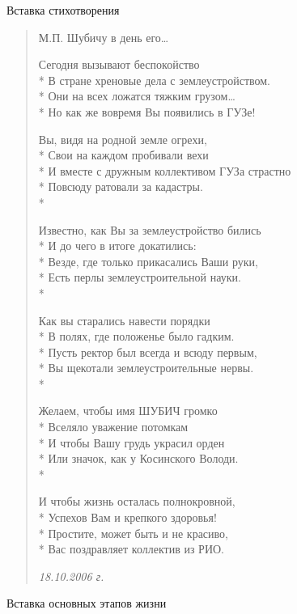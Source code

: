 Вставка стихотворения

\begin{verse}
М.П. Шубичу
в день его…

Сегодня вызывают беспокойство\\*
В стране хреновые дела с землеустройством.\\*
Они на всех ложатся тяжким грузом…\\* 
Но как же вовремя Вы появились в ГУЗе!

Вы, видя на родной земле огрехи,\\*
Свои на каждом пробивали вехи \\*
И вместе с дружным коллективом ГУЗа страстно \\*
Повсюду ратовали за кадастры.\\*

Известно, как Вы за землеустройство бились \\*
И до чего в итоге докатились:\\*
Везде, где только прикасались Ваши руки,\\*
Есть перлы землеустроительной науки.\\*

Как вы старались навести порядки \\*
В полях, где положенье было гадким.\\*
Пусть ректор был всегда и всюду первым,\\*
Вы щекотали землеустроительные нервы.\\*

Желаем, чтобы имя ШУБИЧ громко \\*
Вселяло уважение потомкам \\*
И чтобы Вашу грудь украсил орден \\*
Или значок, как у Косинского Володи.\\*

И чтобы жизнь осталась полнокровной,\\*
Успехов Вам и крепкого здоровья!\\*
Простите, может быть и не красиво,\\*
Вас поздравляет коллектив из РИО.

\textit{18.10.2006 г.}
\end{verse}


Вставка основных этапов жизни



